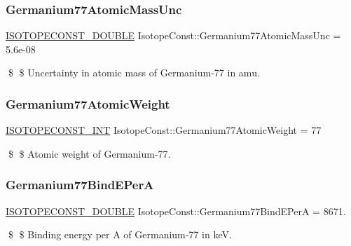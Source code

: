 \subsubsection{\texorpdfstring{Germanium77\+Atomic\+Mass\+Unc}{Germanium77AtomicMassUnc}}
{\footnotesize\ttfamily \mbox{\hyperlink{group___isotope_const-_macros_ga8f45a7272ce02c0b4c65c44636ed719a}{I\+S\+O\+T\+O\+P\+E\+C\+O\+N\+S\+T\+\_\+\+D\+O\+U\+B\+LE}} Isotope\+Const\+::\+Germanium77\+Atomic\+Mass\+Unc = 5.\+6e-\/08}

\$ \$ Uncertainty in atomic mass of Germanium-\/77 in amu. \mbox{\label{group___isotope_const-_germanium-_ge77_gafd8621850a6c4e98f47337a06cd5b7d1}} 
\subsubsection{\texorpdfstring{Germanium77\+Atomic\+Weight}{Germanium77AtomicWeight}}
{\footnotesize\ttfamily \mbox{\hyperlink{group___isotope_const-_macros_ga5f18360b3e99483a35c32d789e62621c}{I\+S\+O\+T\+O\+P\+E\+C\+O\+N\+S\+T\+\_\+\+I\+NT}} Isotope\+Const\+::\+Germanium77\+Atomic\+Weight = 77}

\$ \$ Atomic weight of Germanium-\/77. \mbox{\label{group___isotope_const-_germanium-_ge77_gaae01efa037d061b017cb47c66ffcb9ca}} 
\subsubsection{\texorpdfstring{Germanium77\+Bind\+E\+PerA}{Germanium77BindEPerA}}
{\footnotesize\ttfamily \mbox{\hyperlink{group___isotope_const-_macros_ga8f45a7272ce02c0b4c65c44636ed719a}{I\+S\+O\+T\+O\+P\+E\+C\+O\+N\+S\+T\+\_\+\+D\+O\+U\+B\+LE}} Isotope\+Const\+::\+Germanium77\+Bind\+E\+PerA = 8671.}

\$ \$ Binding energy per A of Germanium-\/77 in keV. \mbox{\label{group___isotope_const-_germanium-_ge77_ga9ac052ad8fc4f933f8d366e23c69aa25}} 
